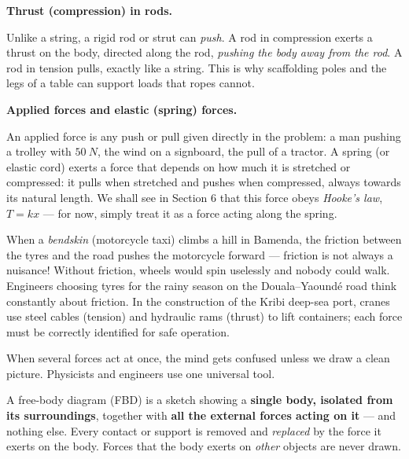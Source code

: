 \documentclass[11pt]{article}
\newcommand{\cle}[1]{{\popxbold\color{popdark}#1}}
\newcounter{popsec}
\newcounter{popsub}
\newcommand{\courssub}[1]{%
  \stepcounter{popsub}%
  \par\vspace{9pt}\noindent{\popxbold\fontsize{11.5}{13}\selectfont\color{popink}{\color{poporange}\thepopsec.\thepopsub}\hspace{6pt}#1}\par\nopagebreak\vspace{4pt}
}
\begin{document}
\textbf{Thrust (compression) in rods.}\par
Unlike a string, a rigid rod or strut can \emph{push}. A rod in compression exerts a \cle{thrust} on the body, directed along the rod, \emph{pushing the body away from the rod}. A rod in tension pulls, exactly like a string. This is why scaffolding poles and the legs of a table can support loads that ropes cannot.

\textbf{Applied forces and elastic (spring) forces.}\par
An \cle{applied force} is any push or pull given directly in the problem: a man pushing a trolley with $\SI{50}{N}$, the wind on a signboard, the pull of a tractor. A \cle{spring} (or elastic cord) exerts a force that depends on how much it is stretched or compressed: it pulls when stretched and pushes when compressed, always towards its natural length. We shall see in Section 6 that this force obeys \emph{Hooke's law}, $T = kx$ — for now, simply treat it as a force acting along the spring.

\begin{savaistu}
When a \emph{bendskin} (motorcycle taxi) climbs a hill in Bamenda, the friction between the tyres and the road pushes the motorcycle forward — friction is not always a nuisance! Without friction, wheels would spin uselessly and nobody could walk. Engineers choosing tyres for the rainy season on the Douala--Yaoundé road think constantly about friction. In the construction of the Kribi deep-sea port, cranes use steel cables (tension) and hydraulic rams (thrust) to lift containers; each force must be correctly identified for safe operation.
\end{savaistu}

\courssub{The Free-Body Diagram}

When several forces act at once, the mind gets confused unless we draw a clean picture. Physicists and engineers use one universal tool.

\begin{definition}
A \cle{free-body diagram} (FBD) is a sketch showing a \textbf{single body, isolated from its surroundings}, together with \textbf{all the external forces acting on it} — and nothing else. Every contact or support is removed and \emph{replaced} by the force it exerts on the body. Forces that the body exerts on \emph{other} objects are never drawn.
\end{definition}
\end{document}
